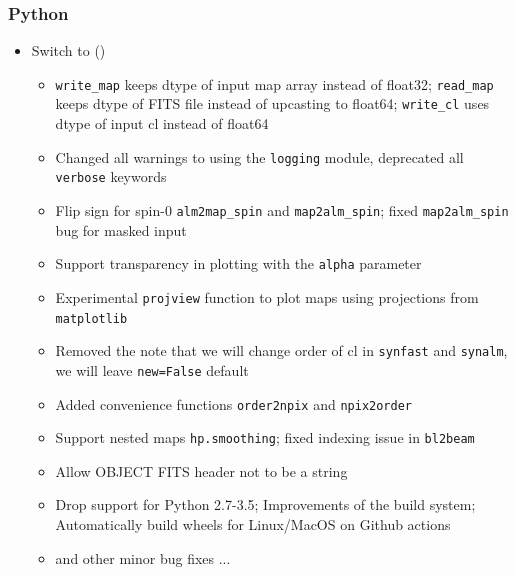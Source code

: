 \documentclass[12pt,twoside]{article}
\begin{document}
\subsubsection[Python]{Python}
\begin{itemize}
\item Switch to 
	()
\begin{itemize}
\item \texttt{write\_map} keeps dtype of input map array instead of float32; \texttt{read\_map} keeps dtype of FITS file instead of upcasting to float64; \texttt{write\_cl} uses dtype of input cl instead of float64
\item Changed all warnings to using the \texttt{logging} module, deprecated all \texttt{verbose} keywords
\item Flip sign for spin-0 \texttt{alm2map\_spin} and \texttt{map2alm\_spin}; fixed \texttt{map2alm\_spin} bug for masked input
\item Support transparency in plotting with the \texttt{alpha} parameter
\item Experimental \texttt{projview} function to plot maps using projections from \texttt{matplotlib}
\item Removed the note that we will change order of cl in \texttt{synfast} and \texttt{synalm}, we will leave \texttt{new=False} default
\item Added convenience functions \texttt{order2npix} and \texttt{npix2order}
\item Support nested maps \texttt{hp.smoothing}; fixed indexing issue in \texttt{bl2beam}
\item Allow OBJECT FITS header not to be a string
\item Drop support for Python 2.7-3.5; Improvements of the build system; Automatically build wheels for Linux/MacOS on Github actions
\item and other minor bug fixes ...
\end{itemize}
\end{itemize}
%
\end{document}
